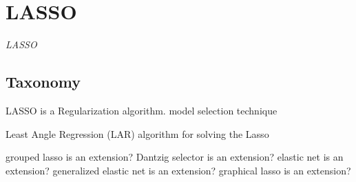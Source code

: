 
\section{LASSO} 
\label{sec:lasso}

\emph{LASSO}

\subsection{Taxonomy}
LASSO is a Regularization algorithm.
model selection technique

Least Angle Regression (LAR) algorithm for solving the Lasso

grouped lasso is an extension?
Dantzig selector is an extension?
elastic net is an extension?
generalized elastic net is an extension?
graphical lasso is an extension?





